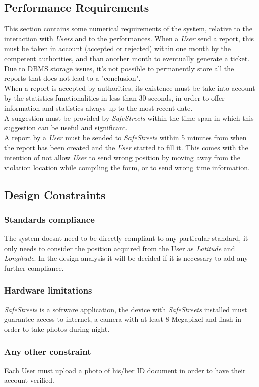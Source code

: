 \subsection{Performance Requirements}
This section contains some numerical requirements of the system, relative to the interaction with \textit{Users} and to the performances.
When a \textit{User} send a report, this must be taken in account (accepted or rejected) within one month by the competent authorities, and than another month to eventually generate a ticket. Due to DBMS storage issues, it's not possible to permanently store all the reports that does not lead to a "conclusion".\\
When a report is accepted by authorities, its existence must be take into account by the statistics functionalities in less than 30 seconds, in order to offer information and statistics always up to the most recent date.\\
A suggestion must be provided by \textit{SafeStreets} within the time span in which this suggestion can be useful and significant. \\
A report by a \textit{User} must be sended to \textit{SafeStreets} within 5 minutes from when the report has been created and the \textit{User} started to fill it. This comes with the intention of not allow \textit{User} to send wrong position by moving away from the violation location while compiling the form, or to send wrong time information.
\subsection{Design
Constraints}

\subsubsection{Standards compliance}
The system doesnt need to be directly compliant to any particular standard, it only needs to consider the position acquired from the User as \textit{Latitude} and \textit{Longitude}. In the design analysis it will be decided if it is necessary to add any further compliance.
\subsubsection{Hardware limitations}
\textit{SafeStreets} is a software application, the device with \textit{SafeStreets} installed must guarantee access to internet, a camera with at least 8 Megapixel and flash in order to take photos during night. 
\subsubsection{Any other constraint}
Each User must upload a photo of his/her ID document in order to have their account verified.
